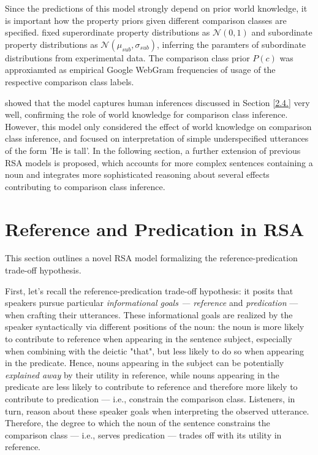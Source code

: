 Since the predictions of this model strongly depend on prior world knowledge, it is important how the property priors given different comparison classes are specified. \textcite{tessler2017warm} fixed superordinate property distributions as $\mathcal{N} (0, 1)$ and subordinate property distributions as $\mathcal{N}(\mu_{sub}, \sigma_{sub})$, inferring the paramters of subordinate distributions from experimental data. The comparison class prior $P(c)$ was approxiamted as empirical Google WebGram frequencies of usage of the respective comparison class labels. 

\textcite{tessler2017warm} showed that the model captures human inferences discussed in Section \ref{2.4.} very well, confirming the role of world knowledge for comparison class inference. 
However, this model only considered the effect of world knowledge on comparison class inference, and focused on interpretation of simple underspecified utterances of the form 'He is tall'. In the following section, a further extension of previous RSA models is proposed, which accounts for more complex sentences containing a noun and integrates more sophisticated reasoning about several effects contributing to comparison class inference.  

\section{Reference and Predication in RSA}
This section outlines a novel RSA model formalizing the reference-predication trade-off hypothesis.

First, let's recall the reference-predication trade-off hypothesis: it posits that speakers pursue particular \emph{informational goals --- reference} and \emph{predication} --- when crafting their utterances. These informational goals are realized by the speaker syntactically via different positions of the noun: the noun is more likely to contribute to reference when appearing in the sentence subject, especially when combining with the deictic "that", but less likely to do so when appearing in the predicate. Hence, nouns appearing in the subject can be potentially \emph{explained away} by their utility in reference, while nouns appearing in the predicate  are less likely to contribute to reference and therefore more likely to contribute to predication --- i.e., constrain the comparison class. Listeners, in turn, reason about these speaker goals when interpreting the observed utterance.  
Therefore, the degree to which the noun of the sentence constrains the comparison class --- i.e., serves predication --- trades off with its utility in reference. 

